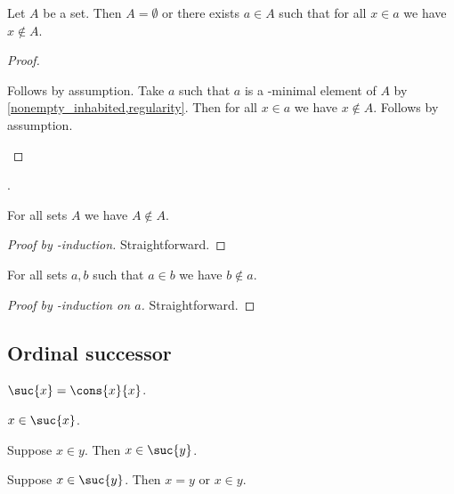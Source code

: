 \begin{theorem}[Foundation]\label{foundation}
    Let $A$ be a set.
    Then $A = \emptyset$ or there exists $a\in A$
    such that for all $x\in a$ we have $x\notin A$.
\end{theorem}
\begin{proof}
    \begin{byCase}
            Follows by assumption.
            Take $a$ such that $a$ is a \in-minimal element of $A$ by \cref{nonempty_inhabited,regularity}.
            Then for all $x\in a$ we have $x\notin A$.
            Follows by assumption.
    \end{byCase}
\end{proof}.

\begin{proposition}\label{in_irrefl}
    For all sets $A$ we have $A\not\in A$.
\end{proposition}
\begin{proof}[Proof by \in-induction]
    Straightforward.
\end{proof}

\begin{proposition}\label{in_asymmetric}
    For all sets $a, b$ such that $a\in b$ we have $b\notin a$.
\end{proposition}
\begin{proof}[Proof by \in-induction on $a$]
    Straightforward.
\end{proof}
\subsection{Ordinal successor}

\begin{definition}\label{suc}
    $\suc{x} = \cons{x}{x}$.
\end{definition}

\begin{proposition}\label{suc_intro_self}
    $x\in\suc{x}$.
\end{proposition}

\begin{proposition}\label{suc_intro_in}
    Suppose $x\in y$. Then $x\in\suc{y}$.
\end{proposition}

\begin{proposition}\label{suc_elim}
    Suppose $x\in\suc{y}$.
    Then $x = y$ or $x\in y$.
\end{proposition}

